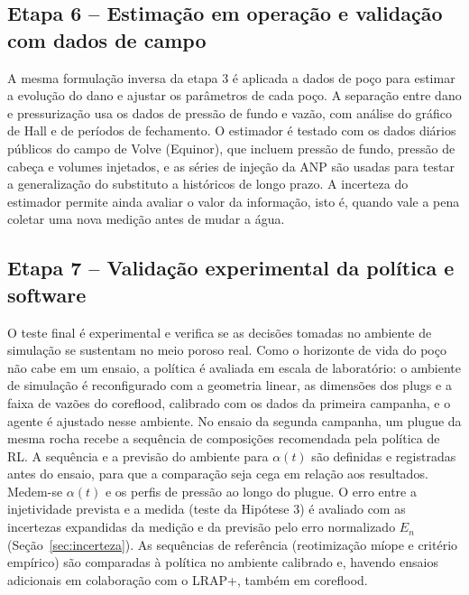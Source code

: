 \documentclass[10pt,a4paper]{article}
\begin{document}
\subsection{Etapa 6 -- Estimação em operação e validação com dados de campo}
A mesma formulação inversa da etapa 3 é aplicada a dados de poço para estimar a evolução
do dano e ajustar os parâmetros de cada poço. A separação entre dano e pressurização usa
os dados de pressão de fundo e vazão, com análise do gráfico de Hall e de períodos de
fechamento. O estimador é testado com os dados diários públicos do campo de Volve
(Equinor), que incluem pressão de fundo, pressão de cabeça e volumes injetados, e as
séries de injeção da ANP são usadas para testar a generalização do substituto a
históricos de longo prazo. A incerteza do estimador permite ainda avaliar o valor da
informação, isto é, quando vale a pena coletar uma nova medição antes de mudar a água.

\subsection{Etapa 7 -- Validação experimental da política e software}
O teste final é experimental e verifica se as decisões tomadas no ambiente de simulação se
sustentam no meio poroso real. Como o horizonte de vida do poço não cabe em um ensaio, a
política é avaliada em escala de laboratório: o ambiente de simulação é reconfigurado com a
geometria linear, as dimensões dos plugs e a faixa de vazões do coreflood, calibrado com
os dados da primeira campanha, e o agente é ajustado nesse ambiente. No ensaio da segunda
campanha, um plugue da mesma rocha recebe a sequência de composições recomendada pela
política de RL. A sequência e a previsão do ambiente para $\alpha(t)$ são definidas e
registradas antes do ensaio, para que a comparação seja cega em relação aos resultados.
Medem-se $\alpha(t)$ e os perfis de pressão ao longo do plugue. O erro entre a injetividade
prevista e a medida (teste da Hipótese 3) é avaliado com as incertezas expandidas da medição
e da previsão pelo erro normalizado $E_n$ (Seção~\ref{sec:incerteza}). As sequências de
referência (reotimização míope e critério empírico) são comparadas à política no ambiente
calibrado e, havendo ensaios adicionais em colaboração com o LRAP+, também em coreflood.
\end{document}
